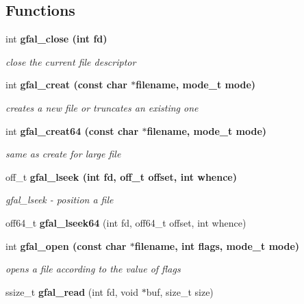 \subsection*{Functions}
\begin{CompactItemize}
\item 
int \bf{gfal\_\-close} (int fd)
\begin{CompactList}\small\item\em close the current file descriptor \item\end{CompactList}\item 
int \bf{gfal\_\-creat} (const char $\ast$filename, mode\_\-t mode)
\begin{CompactList}\small\item\em creates a new file or truncates an existing one \item\end{CompactList}\item 
int \bf{gfal\_\-creat64} (const char $\ast$filename, mode\_\-t mode)\label{group__posix__group_g48783e60cafa1a3bf9aa2170b99f9b08}

\begin{CompactList}\small\item\em same as create for large file \item\end{CompactList}\item 
off\_\-t \bf{gfal\_\-lseek} (int fd, off\_\-t offset, int whence)
\begin{CompactList}\small\item\em gfal\_\-lseek - position a file \item\end{CompactList}\item 
off64\_\-t \textbf{gfal\_\-lseek64} (int fd, off64\_\-t offset, int whence)\label{group__posix__group_g39c7d0b6d366fdb0f218439ed3c3bb37}

\item 
int \bf{gfal\_\-open} (const char $\ast$filename, int flags, mode\_\-t mode)
\begin{CompactList}\small\item\em opens a file according to the value of flags \item\end{CompactList}\item 
ssize\_\-t \textbf{gfal\_\-read} (int fd, void $\ast$buf, size\_\-t size)\label{group__posix__group_gaa6bfe36f33b86e489b798aed96912de}


\end{CompactItemize}
